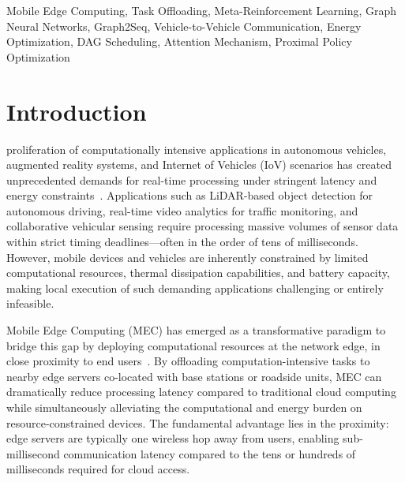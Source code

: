 \documentclass[journal,twoside]{IEEEtran}
\begin{document}
    \begin{IEEEkeywords}
Mobile Edge Computing, Task Offloading, Meta-Reinforcement Learning, Graph Neural Networks, Graph2Seq, Vehicle-to-Vehicle Communication, Energy Optimization, DAG Scheduling, Attention Mechanism, Proximal Policy Optimization
    \end{IEEEkeywords}

    \section{Introduction}
    \label{sec:introduction}

 proliferation of computationally intensive applications in autonomous vehicles, augmented reality systems, and Internet of Vehicles (IoV) scenarios has created unprecedented demands for real-time processing under stringent latency and energy constraints~\cite{mao2017survey}. Applications such as LiDAR-based object detection for autonomous driving, real-time video analytics for traffic monitoring, and collaborative vehicular sensing require processing massive volumes of sensor data within strict timing deadlines---often in the order of tens of milliseconds. However, mobile devices and vehicles are inherently constrained by limited computational resources, thermal dissipation capabilities, and battery capacity, making local execution of such demanding applications challenging or entirely infeasible.

Mobile Edge Computing (MEC) has emerged as a transformative paradigm to bridge this gap by deploying computational resources at the network edge, in close proximity to end users~\cite{mao2017survey, kumar2013survey}. By offloading computation-intensive tasks to nearby edge servers co-located with base stations or roadside units, MEC can dramatically reduce processing latency compared to traditional cloud computing while simultaneously alleviating the computational and energy burden on resource-constrained devices. The fundamental advantage lies in the proximity: edge servers are typically one wireless hop away from users, enabling sub-millisecond communication latency compared to the tens or hundreds of milliseconds required for cloud access.
\end{document}
